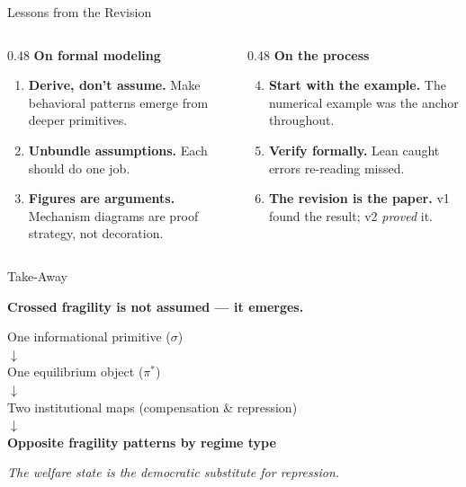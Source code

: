 \documentclass[
  ignorenonframetext,
  aspectratio=169]{beamer}
\begin{document}
\begin{frame}{Lessons from the Revision}
\protect{}\label{lessons-from-the-revision}
\begin{columns}[T]
\begin{column}{0.48\textwidth}
\small
\textbf{On formal modeling}
\begin{enumerate}
  \item \textbf{Derive, don't assume.} Make behavioral patterns emerge from deeper primitives.
  \item \textbf{Unbundle assumptions.} Each should do one job.
  \item \textbf{Figures are arguments.} Mechanism diagrams are proof strategy, not decoration.
\end{enumerate}
\end{column}
\begin{column}{0.48\textwidth}
\small
\textbf{On the process}
\begin{enumerate}
  \setcounter{enumi}{3}
  \item \textbf{Start with the example.} The numerical example was the anchor throughout.
  \item \textbf{Verify formally.} Lean caught errors re-reading missed.
  \item \textbf{The revision is the paper.} v1 found the result; v2 \emph{proved} it.
\end{enumerate}
\end{column}
\end{columns}
\end{frame}

\begin{frame}{Take-Away}
\protect{}\label{take-away}
\begin{center}
\Large
\textbf{Crossed fragility is not assumed --- it emerges.}
\end{center}

\vspace{0.5cm}

\begin{center}
One informational primitive ($\sigma$)\\
$\downarrow$\\
One equilibrium object ($\pi^*$)\\
$\downarrow$\\
Two institutional maps (compensation \& repression)\\
$\downarrow$\\
\textbf{Opposite fragility patterns by regime type}
\end{center}

\vspace{0.5cm}

\begin{center}
\small\textit{The welfare state is the democratic substitute for repression.}
\end{center}
\end{frame}
\end{document}
